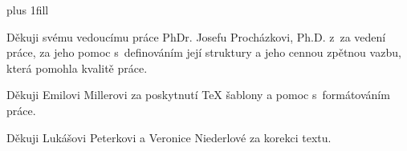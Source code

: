 \vglue 0pt plus 1fill

Děkuji svému vedoucímu práce PhDr. Josefu Procházkovi, Ph.D. z~za vedení práce, za jeho pomoc s~definováním její struktury a jeho cennou zpětnou vazbu, která pomohla kvalitě práce.

Děkuji Emilovi Millerovi za poskytnutí TeX šablony a pomoc s~formátováním práce.

Děkuji Lukášovi Peterkovi a Veronice Niederlové za korekci textu.


\vspace{20mm}
\newpage

